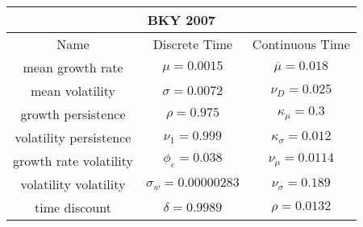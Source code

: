 \documentclass[english]{article}
\begin{document}
\\
\begin{tabular}{|c|c|c|}
	\hline 
	\multicolumn{3}{|c|}{BKY 2007}
	\\
	\hline
	Name & Discrete Time & Continuous Time 
	\\
	\hline 
	\hline 
	mean growth rate & $\mu =  0.0015$ &  $\overline{\mu} = 0.018$
	\\
	\hline 
	mean volatility & $\sigma = 0.0072$ & $\nu_{D}=0.025$
	\\
	\hline 
	growth persistence & $\rho = 0.975$ & $\kappa_{\mu}= 0.3$
	\\
	\hline 
	volatility persistence & $\nu_1 = 0.999$ & $\kappa_{\sigma}=0.012$ 
	\\
	\hline 
	growth rate volatility &  $\phi_e = 0.038$ & $\nu_{\mu}= 0.0114$
	\\
	\hline 
	volatility volatility & $\sigma_w = 0.00000283$ & $\nu_{\sigma}=0.189$ 
	\\
	\hline 
	time discount & $\delta = 0.9989$  & $\rho=0.0132$
	\\
	\hline
\end{tabular}
\end{document}
